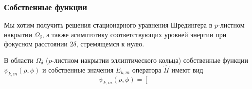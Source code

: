 \subsubsection{Собственные функции}\label{sec:ch1/sec2/sub3/sub1}
Мы хотим получить решения стационарного уравнения
Шредингера в $p$-листном накрытии  $\Omega_\delta$, а также асимптотику соответствующих уровней энергии при фокусном расстоянии $2\delta$, стремящемся к нулю. %



\begin{theorem}
В области $\Omega_\delta$ ($p$-листном накрытии эллиптического кольца) собственные функции $\psi_{k, m}(\rho, \phi)$ и собственные значения $E_{k,m}$ оператора $\hat{H}$ имеют вид
{\small
\begin{equation}
\psi_{k,m}(\rho,\phi) = 
\left[ 
\begin{array}{cll}


\end{array}
\end{equation}}
\end{theorem}
